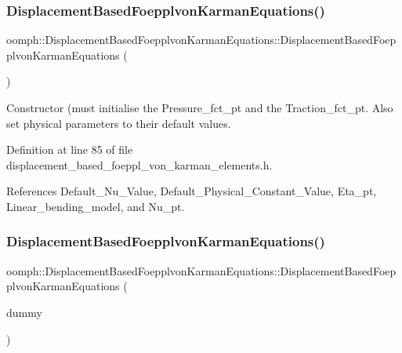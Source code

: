 \subsubsection{\texorpdfstring{Displacement\+Based\+Foepplvon\+Karman\+Equations()}{DisplacementBasedFoepplvonKarmanEquations()}\hspace{0.1cm}{\footnotesize\ttfamily [1/2]}}
{\footnotesize\ttfamily oomph\+::\+Displacement\+Based\+Foepplvon\+Karman\+Equations\+::\+Displacement\+Based\+Foepplvon\+Karman\+Equations (\begin{DoxyParamCaption}{ }\end{DoxyParamCaption})\hspace{0.3cm}{\ttfamily [inline]}}



Constructor (must initialise the Pressure\+\_\+fct\+\_\+pt and the Traction\+\_\+fct\+\_\+pt. Also set physical parameters to their default values. 



Definition at line 85 of file displacement\+\_\+based\+\_\+foeppl\+\_\+von\+\_\+karman\+\_\+elements.\+h.



References Default\+\_\+\+Nu\+\_\+\+Value, Default\+\_\+\+Physical\+\_\+\+Constant\+\_\+\+Value, Eta\+\_\+pt, Linear\+\_\+bending\+\_\+model, and Nu\+\_\+pt.

\mbox{\label{classoomph_1_1DisplacementBasedFoepplvonKarmanEquations_ac694a78436d8ebe190e81ad7f5c5e37a}} 
\subsubsection{\texorpdfstring{Displacement\+Based\+Foepplvon\+Karman\+Equations()}{DisplacementBasedFoepplvonKarmanEquations()}\hspace{0.1cm}{\footnotesize\ttfamily [2/2]}}
{\footnotesize\ttfamily oomph\+::\+Displacement\+Based\+Foepplvon\+Karman\+Equations\+::\+Displacement\+Based\+Foepplvon\+Karman\+Equations (\begin{DoxyParamCaption}\item[{const \hyperlink{classoomph_1_1DisplacementBasedFoepplvonKarmanEquations}{Displacement\+Based\+Foepplvon\+Karman\+Equations} \&}]{dummy }\end{DoxyParamCaption})\hspace{0.3cm}{\ttfamily [inline]}}




